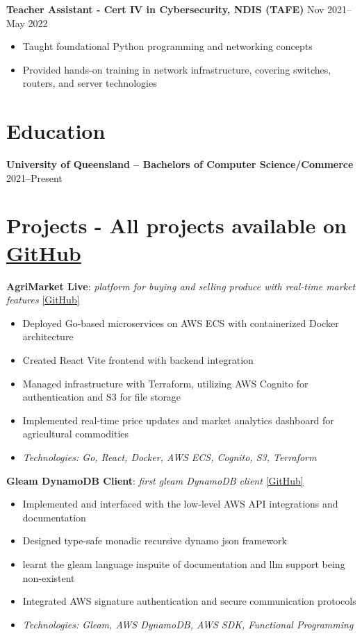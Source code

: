 \documentclass[10pt,a4paper]{article}
\begin{document}
	\textbf{Teacher Assistant - Cert IV in Cybersecurity, NDIS (TAFE)} \hfill Nov 2021--May 2022 
	\begin{itemize}[label=\textbullet, itemsep=0.02cm]
		\item Taught foundational Python programming and networking concepts
		\item Provided hands-on training in network infrastructure, covering switches, routers, and server technologies
	\end{itemize}
	
	\section{Education}
	\textbf{University of Queensland -- Bachelors of Computer Science/Commerce} \hfill 2021--Present \\	
	\section{Projects -  \textbf{All projects available on} \href{https://github.com/CameronBadman}{GitHub} }
	
	\textbf{AgriMarket Live}: \textit{platform for buying and selling produce with real-time market features} \href{https://github.com/CSSE6400/2025_P3_AgriMarket}{[GitHub]}
	\begin{itemize}[label=\textbullet, itemsep=0.05cm]
		\item Deployed Go-based microservices on AWS ECS with containerized Docker architecture
		\item Created React Vite frontend with backend integration
		\item Managed infrastructure with Terraform, utilizing AWS Cognito for authentication and S3 for file storage
		\item Implemented real-time price updates and market analytics dashboard for agricultural commodities
		\item \textit{Technologies: Go, React, Docker, AWS ECS, Cognito, S3, Terraform}
	\end{itemize}
	
	
	\textbf{Gleam DynamoDB Client}: \textit{first gleam DynamoDB client} \href{https://github.com/CameronBadman/DynamoDb-gleam-client}{[GitHub]}
	\begin{itemize}[label=\textbullet, itemsep=0.05cm]
		\item Implemented and interfaced with the low-level AWS API integrations and documentation
		\item Designed type-safe monadic recursive dynamo json framework
		\item learnt the gleam language inspuite of documentation and llm support being non-existent 
		\item Integrated AWS signature authentication and secure communication protocols
		\item \textit{Technologies: Gleam, AWS DynamoDB, AWS SDK, Functional Programming}
	\end{itemize}
	
\end{document}

